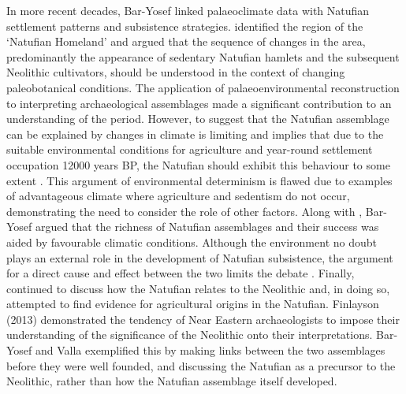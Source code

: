 \documentclass[%
	]{ijsra}
\begin{document}
In more recent decades, Bar-Yosef linked palaeoclimate data with Natufian settlement patterns and subsistence strategies. \textcite[157]{Bar-Yosef_1998} identified the region of the ‘Natufian Homeland’ and argued that the sequence of changes in the area, predominantly the appearance of sedentary Natufian hamlets and the subsequent Neolithic cultivators, should be understood in the context of changing paleobotanical conditions. The application of palaeoenvironmental reconstruction to interpreting archaeological assemblages made a significant contribution to an understanding of the period. 
However, to suggest that the Natufian assemblage can be explained by changes in climate is limiting and implies that due to the suitable environmental conditions for agriculture and year-round settlement occupation \num{12000} years BP, the Natufian should exhibit this behaviour to some extent \parencite[161]{Bar-Yosef_1998}. This argument of environmental determinism is flawed due to examples of advantageous climate where agriculture and sedentism do not occur, demonstrating the need to consider the role of other factors. 
Along with \textcite{Valla_1991}, Bar-Yosef argued that the richness of Natufian assemblages and their success was aided by favourable climatic conditions. 
Although the environment no doubt plays an external role in the development of Natufian subsistence, the argument for a direct cause and effect between the two limits the debate \parencite{Fletcher_2007}. 
Finally, \textcite[175]{Bar-Yosef_2011} continued to discuss how the Natufian relates to the Neolithic and, in doing so, attempted to find evidence for agricultural origins in the Natufian. 
Finlayson (2013) %
demonstrated the tendency of Near Eastern archaeologists to impose their understanding of the significance of the Neolithic onto their interpretations. Bar-Yosef and Valla exemplified this by making links between the two assemblages before they were well founded, and discussing the Natufian as a precursor to the Neolithic, rather than how the Natufian assemblage itself developed. 

\end{document}
